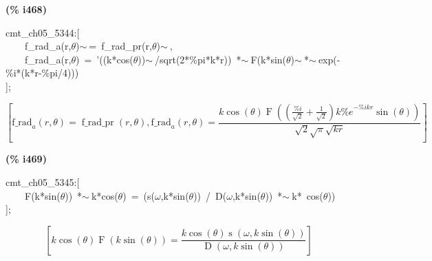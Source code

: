 \documentclass[fleqn]{article}
\begin{document}
\noindent
\begin{minipage}[t]{4.000000em}\color{red}\bfseries
(\% i468)	
\end{minipage}
\begin{minipage}[t]{\textwidth}\color{blue}
cmt\_ch05\_5344:[\\
\ \ \ \ f\_rad\_a(r,\ensuremath{\theta})\ensuremath{\sim\ }=\ f\_rad\_pr(r,\ensuremath{\theta})\ensuremath{\sim\ },\ \\
\ \ \ \ f\_rad\_a(r,\ensuremath{\theta})\ =\ '((k*cos(\ensuremath{\theta}))\ensuremath{\sim\ }/sqrt(2*\%pi*k*r))\ *\ensuremath{\sim\ }F(k*sin(\ensuremath{\theta})\ensuremath{\sim\ }*\ensuremath{\sim\ }exp(-\%i*(k*r-\%pi/4)))\\
];
\end{minipage}
\[\displaystyle \tag{\% o468} 
\operatorname{[}{{\ensuremath{\mathrm{f\_ rad}}}_a}\left( r\operatorname{,}\theta \right) =\operatorname{f\_ rad\_ pr}\left( r\operatorname{,}\theta \right) \operatorname{,}{{\ensuremath{\mathrm{f\_ rad}}}_a}\left( r\operatorname{,}\theta \right) =
\frac{k \cos{\left( \theta \right) } \operatorname{F}\left( \left( \frac{\% i}{\sqrt{2}}+\frac{1}{\sqrt{2}}\right)  k {{\% e}^{-\% i k r}} \sin{\left( \theta \right) }\right) }{\sqrt{2} \sqrt{\ensuremath{\pi} } \sqrt{k r}}\operatorname{]}\mbox{}
\]


\noindent
\begin{minipage}[t]{4.000000em}\color{red}\bfseries
(\% i469)	
\end{minipage}
\begin{minipage}[t]{\textwidth}\color{blue}
cmt\_ch05\_5345:[\\
\ \ \ \ F(k*sin(\ensuremath{\theta}))\ *\ensuremath{\sim\ }k*cos(\ensuremath{\theta})\ =\ (s(\ensuremath{\omega},k*sin(\ensuremath{\theta}))\ /\ D(\ensuremath{\omega},k*sin(\ensuremath{\theta}))\ *\ensuremath{\sim\ }k*\ cos(\ensuremath{\theta}))\\
];
\end{minipage}
\[\displaystyle \tag{\% o469} 
\left[ k \cos{\left( \theta \right) } \operatorname{F}\left( k \sin{\left( \theta \right) }\right) =\frac{k \cos{\left( \theta \right) } \operatorname{s}\left( \omega \operatorname{,}k \sin{\left( \theta \right) }\right) }{\operatorname{D}\left( \omega \operatorname{,}k \sin{\left( \theta \right) }\right) }\right] \mbox{}
\]
\end{document}
